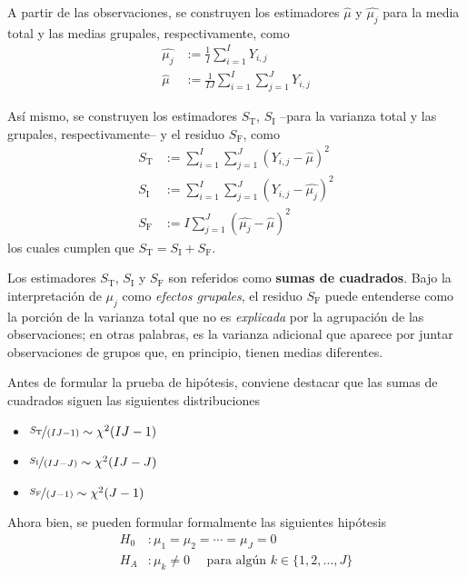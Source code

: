 \documentclass[12pt,letterpaper]{book}
\begin{document}
A partir de las observaciones, se construyen los estimadores $\widehat{\mu}$ y $\widehat{\mu_j}$ para la media total y las medias grupales, respectivamente, como
\begin{align}
\widehat{\mu_j} &{:=}  \frac{1}{I} \sum_{i = 1}^{I} Y_{i,j} \\
\widehat{\mu}   &{:=}  \frac{1}{I J} \sum_{i = 1}^{I} \sum_{j = 1}^{J} Y_{i,j}
\end{align}

Así mismo, se construyen los estimadores $S_{\text{T}}$, $S_{\text{I}}$ --para la varianza total y las grupales, respectivamente-- y el residuo $S_{\text{F}}$, como
\begin{align}
S_{\text{T}}  &{:=} \sum_{i = 1}^{I} \sum_{j = 1}^{J} \left( Y_{i,j} - \widehat{\mu} \right)^2 \\
S_{\text{I}} &{:=} \sum_{i = 1}^{I} \sum_{j = 1}^{J} \left( Y_{i,j} - \widehat{\mu_j} \right)^2 \\
S_{\text{F}} &{:=} I \sum_{j = 1}^{J} \left( \widehat{\mu_j} - \widehat{\mu} \right)^2
\end{align}
los cuales cumplen que $S_{\text{T}} = S_{\text{I}} + S_{\text{F}}$.

Los estimadores $S_{\text{T}}$, $S_{\text{I}}$ y $S_{\text{F}}$ son referidos como \textbf{sumas de cuadrados}. 
%
Bajo la interpretación de $\mu_j$ como \textit{efectos grupales}, el residuo $S_{\text{F}}$ puede entenderse como la porción de la varianza total que no es \textit{explicada} por la agrupación de las observaciones; en otras palabras, es la varianza adicional que aparece por juntar observaciones de grupos que, en principio, tienen medias diferentes.

Antes de formular la prueba de hipótesis, conviene destacar que las sumas de cuadrados siguen las siguientes distribuciones 
\begin{itemize}
\item $\nicefrac{S_{\text{T}}}{(I J - 1)} \sim \chi^2(I J - 1)$
\item $\nicefrac{S_{\text{I}}}{(I J - J)} \sim \chi^2(I J - J)$
\item $\nicefrac{S_{\text{F}}}{(J - 1)} \sim \chi^2(J - 1)$
\end{itemize}

Ahora bien, se pueden formular formalmente las siguientes hipótesis
\begin{align}
H_0 &: \mu_1 = \mu_2 = \cdots = \mu_J = 0 \\
H_A &: \mu_k \neq 0 \quad \text{ para algún } k \in \{ 1, 2, \dots, J \}
\end{align}
\end{document}
